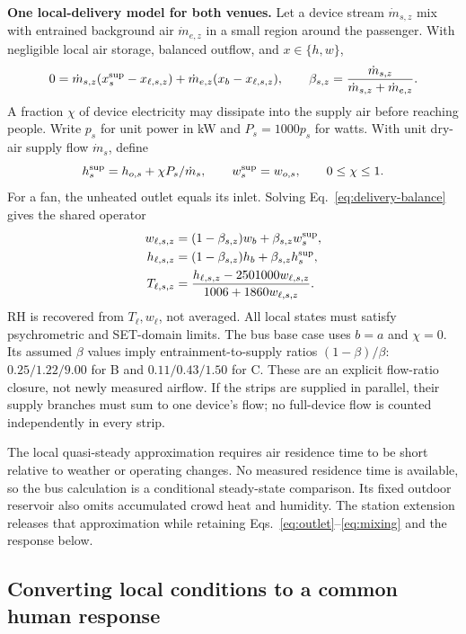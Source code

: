 \documentclass[12pt]{article}
\begin{document}
\noindent\textbf{One local-delivery model for both venues.} Let a device stream $\dot m_{s,z}$ mix with entrained background air $\dot m_{e,z}$ in a small region around the passenger. With negligible local air storage, balanced outflow, and $x\in\{h,w\}$,
\begin{equation}
 0=\dot m_{s,z}(x_s^{\rm sup}-x_{\ell,s,z})+
 \dot m_{e,z}(x_b-x_{\ell,s,z}),\qquad
 \beta_{s,z}=\frac{\dot m_{s,z}}{\dot m_{s,z}+\dot m_{e,z}}.
\label{eq:delivery-balance}
\end{equation}
A fraction $\chi$ of device electricity may dissipate into the supply air before reaching people. Write $p_s$ for unit power in kW and $P_s=1000p_s$ for watts. With unit dry-air supply flow $\dot m_s$, define
\begin{equation}
 h_s^{\rm sup}=h_{o,s}+\chi P_s/\dot m_s,\qquad
 w_s^{\rm sup}=w_{o,s},\qquad 0\leq\chi\leq1.
\label{eq:supply-heat}
\end{equation}
For a fan, the unheated outlet equals its inlet. Solving Eq.~\eqref{eq:delivery-balance} gives the shared operator
\begin{align}
 w_{\ell,s,z}&=(1-\beta_{s,z})w_b+\beta_{s,z}w_s^{\rm sup},\\
 h_{\ell,s,z}&=(1-\beta_{s,z})h_b+\beta_{s,z}h_s^{\rm sup},\\
 T_{\ell,s,z}&=\frac{h_{\ell,s,z}-2501000w_{\ell,s,z}}{1006+1860w_{\ell,s,z}}.
\label{eq:mixing}
\end{align}
RH is recovered from $T_\ell,w_\ell$, not averaged. All local states must satisfy psychrometric and SET-domain limits. The bus base case uses $b=a$ and $\chi=0$. Its assumed $\beta$ values imply entrainment-to-supply ratios $(1-\beta)/\beta$: $0.25/1.22/9.00$ for B and $0.11/0.43/1.50$ for C. These are an explicit flow-ratio closure, not newly measured airflow. If the strips are supplied in parallel, their supply branches must sum to one device's flow; no full-device flow is counted independently in every strip.

The local quasi-steady approximation requires air residence time to be short relative to weather or operating changes. No measured residence time is available, so the bus calculation is a conditional steady-state comparison. Its fixed outdoor reservoir also omits accumulated crowd heat and humidity. The station extension releases that approximation while retaining Eqs.~\eqref{eq:outlet}--\eqref{eq:mixing} and the response below.

\subsection{Converting local conditions to a common human response}
\end{document}
